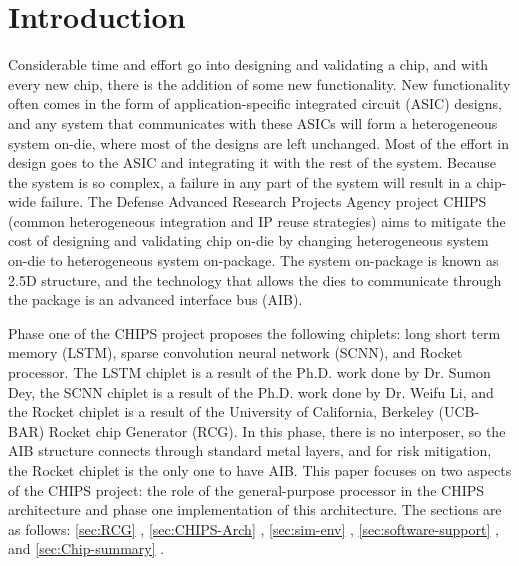 \documentclass[../main.tex]{subfiles}
\begin{document}
\section{Introduction}
Considerable time and effort go into designing and validating a chip, and with every new chip, there is the addition of some new functionality. New functionality often comes in the form of application-specific integrated circuit (ASIC) designs, and any system that communicates with these ASICs will form a heterogeneous system on-die, where most of the designs are left unchanged. Most of the effort in design goes to the ASIC and integrating it with the rest of the system. Because the system is so complex, a failure in any part of the system will result in a chip-wide failure. The Defense Advanced Research Projects Agency project CHIPS (common heterogeneous integration and IP reuse strategies) aims to mitigate the cost of designing and validating chip on-die by changing heterogeneous system on-die to heterogeneous system on-package. The system on-package is known as 2.5D structure, and the technology that allows the dies to communicate through the package is an advanced interface bus (AIB). 

Phase one of the CHIPS project proposes the following chiplets: long short term memory (LSTM), sparse convolution neural network (SCNN), and Rocket processor. The LSTM chiplet is a result of the Ph.D. work done by Dr. Sumon Dey, the SCNN chiplet is a result of the Ph.D. work done by Dr. Weifu Li, and the Rocket chiplet is a result of the University of California, Berkeley (UCB-BAR) Rocket chip Generator (RCG). In this phase, there is no interposer, so the AIB structure connects through standard metal layers, and for risk mitigation, the Rocket chiplet is the only one to have AIB. This paper focuses on two aspects of the CHIPS project: the role of the general-purpose processor in the CHIPS architecture and phase one implementation of this architecture. The sections are as follows: \ref{sec:RCG} , \ref{sec:CHIPS-Arch} , \ref{sec:sim-env} , \ref{sec:software-support} , and \ref{sec:Chip-summary} .
\end{document}
